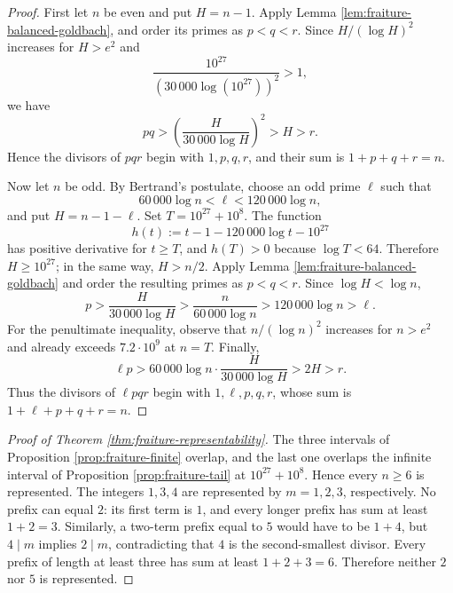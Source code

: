 \documentclass[11pt,letterpaper,reqno]{amsart}
\numberwithin{equation}{section}
\theoremstyle{remark}
\newtheorem{remark}[theorem]{Remark}
\renewcommand{\geq}{\geqslant}
\begin{document}
\begin{proof}
First let $n$ be even and put $H=n-1$. Apply
Lemma \ref{lem:fraiture-balanced-goldbach}, and order its primes as
$p<q<r$. Since $H/(\log H)^2$ increases for $H>e^2$ and
\[
 \frac{10^{27}}{(30\,000\log(10^{27}))^2}>1,
\]
we have
\[
 pq>\left(\frac{H}{30\,000\log H}\right)^2>H>r.
\]
Hence the divisors of $pqr$ begin with $1,p,q,r$, and their sum is
$1+p+q+r=n$.

Now let $n$ be odd. By Bertrand's postulate, choose an odd prime $\ell$
such that
\[
 60\,000\log n<\ell<120\,000\log n,
\]
and put $H=n-1-\ell$. Set $T=10^{27}+10^8$. The function
\[
 h(t):=t-1-120\,000\log t-10^{27}
\]
has positive derivative for $t\geq T$, and $h(T)>0$ because
$\log T<64$. Therefore $H\geq10^{27}$; in the same way,
$H>n/2$. Apply Lemma \ref{lem:fraiture-balanced-goldbach} and order
the resulting primes as $p<q<r$. Since $\log H<\log n$,
\[
 p>\frac{H}{30\,000\log H}
 >\frac{n}{60\,000\log n}
 >120\,000\log n>\ell.
\]
For the penultimate inequality, observe that
$n/(\log n)^2$ increases for $n>e^2$ and already exceeds
$7.2\cdot10^9$ at $n=T$. Finally,
\[
 \ell p>
 60\,000\log n\cdot\frac{H}{30\,000\log H}
 >2H>r.
\]
Thus the divisors of $\ell pqr$ begin with $1,\ell,p,q,r$, whose sum is
$1+\ell+p+q+r=n$.
\end{proof}

\begin{proof}[Proof of Theorem \ref{thm:fraiture-representability}]
The three intervals of Proposition \ref{prop:fraiture-finite} overlap,
and the last one overlaps the infinite interval of
Proposition \ref{prop:fraiture-tail} at $10^{27}+10^8$.
Hence every $n\geq6$ is represented. The integers $1,3,4$ are represented
by $m=1,2,3$, respectively. No prefix can equal $2$: its first term is
$1$, and every longer prefix has sum at least $1+2=3$. Similarly, a
two-term prefix equal to $5$ would have to be $1+4$, but $4\mid m$
implies $2\mid m$, contradicting that $4$ is the second-smallest divisor.
Every prefix of length at least three has sum at least $1+2+3=6$.
Therefore neither $2$ nor $5$ is represented.
\end{proof}

\end{document}
